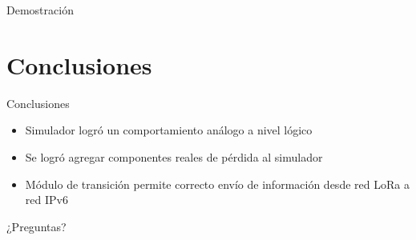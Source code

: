 \documentclass[10pt]{beamer}
\begin{document}
\begin{frame}[fragile]{Demostración}

\centering{}
 
\end{frame}

\section{Conclusiones}
\begin{frame}[fragile]{Conclusiones}
\begin{itemize}
\item Simulador logró un comportamiento análogo a nivel lógico
\item Se logró agregar componentes reales de pérdida al simulador
\item Módulo de transición permite correcto envío de información desde red LoRa a red IPv6
\end{itemize}
\end{frame}

\begin{frame}[standout]
  ¿Preguntas?
\end{frame}

\appendix
\end{document}
